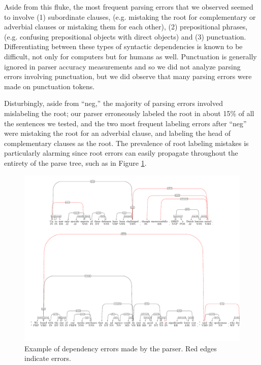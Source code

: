 \documentclass[12pt]{article}
\begin{document}
Aside from this fluke, the most frequent parsing errors that we observed seemed to involve (1) subordinate clauses, (e.g. mistaking the root for complementary or adverbial clauses or mistaking them for each other), (2) prepositional phrases, (e.g. confusing prepositional objects with direct objects) and (3) punctuation. Differentiating between these types of syntactic dependencies is known to be difficult, not only for computers but for humans as well. Punctuation is generally ignored in parser accuracy measurements and so we did not analyze parsing errors involving punctuation, but we did observe that many parsing errors were made on punctuation tokens.

Disturbingly, aside from ``neg,'' the majority of parsing errors involved mislabeling the root; our parser erroneously labeled the root in about 15\% of all the sentences we tested, and the two most frequent labeling errors after ``neg'' were mistaking the root for an adverbial clause, and labeling the head of complementary clauses as the root. The prevalence of root labeling mistakes is particularly alarming since root errors can easily propagate throughout the entirety of the parse tree, such as in Figure \ref{propfig}. 
\begin{figure}[!ht]
\begin{center}
\includegraphics[scale=0.8]{sentence.pdf}
\caption{Example of dependency errors made by the parser. Red edges indicate errors. \label{propfig}}
\end{center}
\end{figure}
\end{document}

